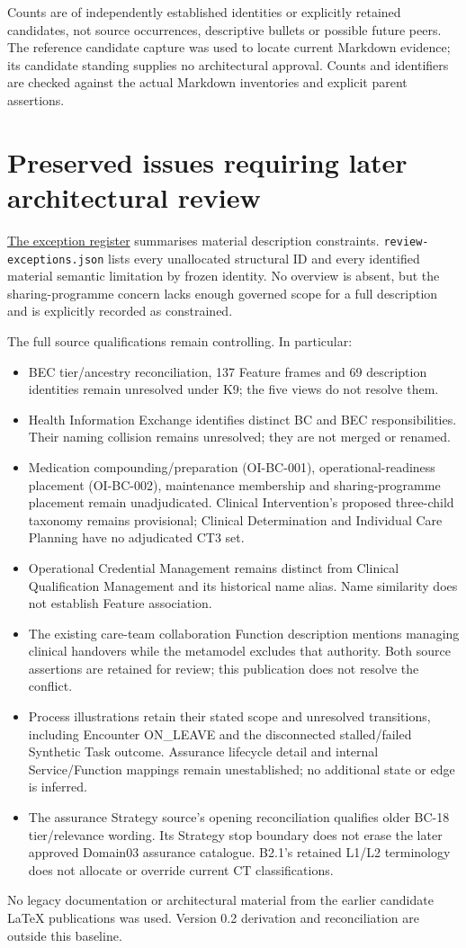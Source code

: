 Counts are of independently established identities or explicitly retained candidates,
not source occurrences, descriptive bullets or possible future peers. The reference
candidate capture was used to locate current Markdown evidence; its candidate
standing supplies no architectural approval. Counts and identifiers are checked
against the actual Markdown inventories and explicit parent assertions.

\section{Preserved issues requiring later architectural review}

\hyperref[model:exceptions]{The exception register} summarises material description
constraints. \texttt{review-exceptions.json} lists every unallocated structural ID
and every identified material semantic limitation by frozen identity. No overview
is absent, but the sharing-programme concern lacks enough governed scope for a
full description and is explicitly recorded as constrained.

The full source qualifications remain controlling. In particular:
\begin{itemize}
\item BEC tier/ancestry reconciliation, 137 Feature frames and 69 description
identities remain unresolved under K9; the five views do not resolve them.
\item Health Information Exchange identifies distinct BC and BEC responsibilities.
Their naming collision remains unresolved; they are not merged or renamed.
\item Medication compounding/preparation (OI-BC-001), operational-readiness
placement (OI-BC-002), maintenance membership and sharing-programme placement
remain unadjudicated. Clinical Intervention's proposed three-child taxonomy
remains provisional; Clinical Determination and Individual Care Planning have
no adjudicated CT3 set.
\item Operational Credential Management remains distinct from Clinical
Qualification Management and its historical name alias. Name similarity does
not establish Feature association.
\item The existing care-team collaboration Function description mentions managing
clinical handovers while the metamodel excludes that authority. Both source
assertions are retained for review; this publication does not resolve the conflict.
\item Process illustrations retain their stated scope and unresolved transitions,
including Encounter ON\_LEAVE and the disconnected stalled/failed Synthetic Task
outcome. Assurance lifecycle detail and internal Service/Function mappings remain
unestablished; no additional state or edge is inferred.
\item The assurance Strategy source's opening reconciliation qualifies older BC-18
tier/relevance wording. Its Strategy stop boundary does not erase the later
approved Domain03 assurance catalogue. B2.1's retained L1/L2 terminology does not
allocate or override current CT classifications.
\end{itemize}

No legacy documentation or architectural material from the earlier candidate LaTeX
publications was used. Version 0.2 derivation and reconciliation are outside this baseline.
